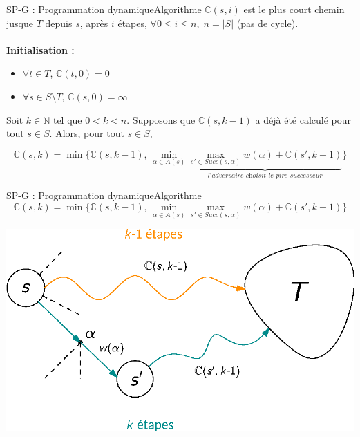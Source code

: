 \documentclass[compress]{beamer}
\theoremstyle{theorem}%
\begin{document}
\begin{frame}{SP-G : Programmation dynamique}{Algorithme}
    $\mathbb{C}(s, i)$ est le plus court chemin jusque $T$ depuis $s$, après $i$ étapes, $\forall 0 \leq i \leq n, \; n = |S|$ (pas de cycle).%
    \\ $ $ \vspace{-0.03\linewidth}\\
      \textbf{\color{fibeamer@orange}Initialisation : }
      \begin{itemize}
        \item $\forall t \in T$, $\mathbb{C}(t, 0) = 0$
        \item $\forall s \in S \setminus T$, $\mathbb{C}(s, 0) = \infty$
      \end{itemize}
      Soit $k \in \mathbb{N}$ tel que $0 < k < n$. Supposons que $\mathbb{C}(s, k-1)$ a déjà été calculé pour tout $s \in S$.
        Alors, pour tout $s \in S$,

  \[
    \mathbb{C}(s, k) =
    \min \{
      \mathbb{C}(s, k-1), \,
        \min_{\alpha \in A(s)} \underbrace{\max_{s'\in Succ(s, \alpha)} w(\alpha) + \mathbb{C}(s', k-1)}_{\textit{l'adversaire choisit le pire successeur}}
    \}
  \]
\end{frame}

\begin{frame}{SP-G : Programmation dynamique}{Algorithme}
  \[
    \mathbb{C}(s, k) =
    \min \{
      \mathbb{C}(s, k-1), \,
        \min_{\alpha \in A(s)} \max_{s'\in Succ(s, \alpha)} w(\alpha) + \mathbb{C}(s', k-1)
    \}
  \]
  \begin{center}
    \includegraphics[width=0.6\linewidth]{resources/sp-g}
  \end{center}
\end{frame}
\end{document}
